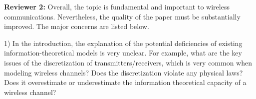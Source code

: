 \documentclass[a4paper,12pt]{article}
\begin{document}
{}


\textbf{Reviewer 2:}
Overall, the topic is fundamental and important to wireless communications. Nevertheless, the quality of the paper must be substantially improved. The major concerns are listed below.

1) In the introduction, the explanation of the potential deficiencies of existing information-theoretical models is very unclear. For example, what are the key issues of the discretization of transmitters/receivers, which is very common when modeling wireless channels? Does the discretization violate any physical laws? Does it overestimate or underestimate the information theoretical capacity of a wireless channel?
\end{document}
